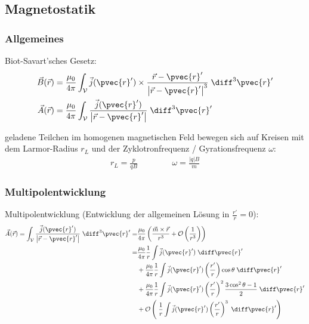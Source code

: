 \documentclass[11pt]{article}
\numberwithin{equation}{section}
\begin{document}
    \subsection{Magnetostatik}
      \subsubsection{Allgemeines}
        Biot-Savart'sches Gesetz:
        \begin{equation}
          \begin{aligned}
            \vec{B}(\vec{r}) &= \frac{\mu_0}{4\pi}\int_{\mathcal{V}} \vec{j}(\pvec{r}')\times\frac{\vec{r}-\pvec{r}'}{\left|\vec{r}-\pvec{r}'\right|^3}\;\diff^3\pvec{r}' \\
            \vec{A}(\vec{r}) &= \frac{\mu_0}{4\pi} \int_{\mathcal{V}} \frac{\vec{j}(\pvec{r}')}{\left|\vec{r}-\pvec{r}'\right|} \;\diff^3\pvec{r}'
          \end{aligned}
        \end{equation}

        geladene Teilchen im homogenen magnetischen Feld bewegen sich auf Kreisen mit dem Larmor-Radius $r_L$ und der Zyklotronfrequenz / Gyrationsfrequenz $\omega$:
        \begin{equation}
          \begin{aligned}
            r_L = \frac{p}{qB} &&\hspace{30pt} %
            \omega = \frac{|q| B}{m}
          \end{aligned}
        \end{equation}

      \subsubsection{Multipolentwicklung}
        Multipolentwicklung (Entwicklung der allgemeinen Lösung in $\frac{r'}{r}=0$):
        \begin{equation}
          \begin{aligned}
            \vec{A}(\vec{r}) = \int_{\mathcal{V}} \frac{\vec{j}(\pvec{r}')}{\left|\vec{r}-\pvec{r}'\right|} \;\diff^3\pvec{r}'
            =& \frac{\mu_0}{4\pi} \left(\frac{\vec{m}\times\vec{r}}{r^3} + \mathcal{O}\left(\frac{1}{r^3}\right)\right) \\
            =& \frac{\mu_0}{4\pi}\frac{1}{r}\int\vec{j}(\pvec{r}')\;\diff \pvec{r}' \\
            &+ \frac{\mu_0}{4\pi}\frac{1}{r}\int\vec{j}(\pvec{r}')\left(\frac{r'}{r}\right)\cos\theta\;\diff \pvec{r}' \\
            &+ \frac{\mu_0}{4\pi}\frac{1}{r}\int\vec{j}(\pvec{r}')\left(\frac{r'}{r}\right)^2\frac{3\cos^2\theta-1}{2}\;\diff \pvec{r}' \\
            &+ \mathcal{O}\left(\;\frac{1}{r}\int\vec{j}(\pvec{r}')\left(\frac{r'}{r}\right)^3 \;\diff \pvec{r}'\right) \\
          \end{aligned}
        \end{equation}
\end{document}
